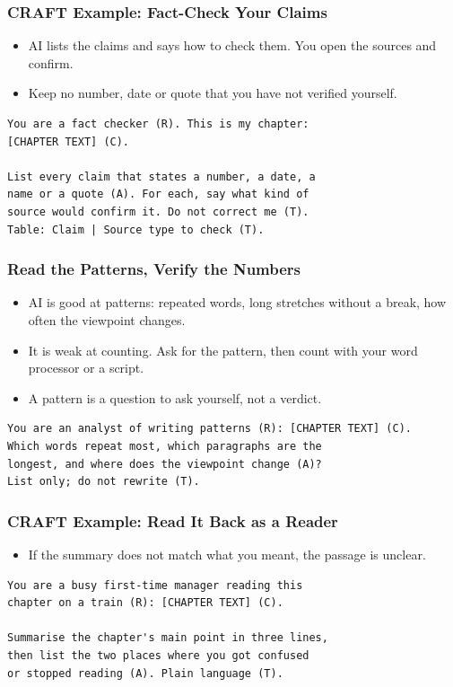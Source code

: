 \begin{frame}[fragile]\frametitle{CRAFT Example: Fact-Check Your Claims}
\begin{itemize}
\item AI lists the claims and says how to check them. You open the sources and confirm.
\item Keep no number, date or quote that you have not verified yourself.
\end{itemize}
\begin{lstlisting}[language=HTML]
You are a fact checker (R). This is my chapter:
[CHAPTER TEXT] (C).

List every claim that states a number, a date, a
name or a quote (A). For each, say what kind of
source would confirm it. Do not correct me (T).
Table: Claim | Source type to check (T).
\end{lstlisting}
\end{frame}

\begin{frame}[fragile]\frametitle{Read the Patterns, Verify the Numbers}
\begin{itemize}
\item AI is good at patterns: repeated words, long stretches without a break, how often the viewpoint changes.
\item It is weak at counting. Ask for the pattern, then count with your word processor or a script.
\item A pattern is a question to ask yourself, not a verdict.
\end{itemize}
\begin{lstlisting}[language=HTML]
You are an analyst of writing patterns (R): [CHAPTER TEXT] (C).
Which words repeat most, which paragraphs are the
longest, and where does the viewpoint change (A)?
List only; do not rewrite (T).
\end{lstlisting}
\end{frame}

\begin{frame}[fragile]\frametitle{CRAFT Example: Read It Back as a Reader}
\begin{itemize}
\item If the summary does not match what you meant, the passage is unclear.
\end{itemize}
\begin{lstlisting}[language=HTML]
You are a busy first-time manager reading this
chapter on a train (R): [CHAPTER TEXT] (C).

Summarise the chapter's main point in three lines,
then list the two places where you got confused
or stopped reading (A). Plain language (T).
\end{lstlisting}
\end{frame}

